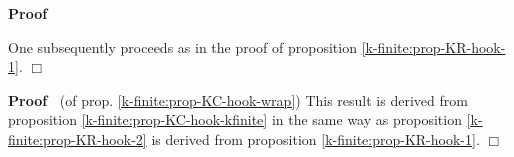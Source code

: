 \documentclass{article}
\newenvironment{proof}{\noindent\textbf{Proof\ }}{\hspace*{\fill}$\Box$\medskip}
\begin{document}
\begin{proof}
  
  One subsequently proceeds as in the proof of proposition
  \ref{k-finite:prop-KR-hook-1}.
\end{proof}

\begin{proof}
  (of prop. \ref{k-finite:prop-KC-hook-wrap}) This result is derived from
  proposition \ref{k-finite:prop-KC-hook-kfinite} in the same way as
  proposition \ref{k-finite:prop-KR-hook-2} is derived from proposition
  \ref{k-finite:prop-KR-hook-1}.
\end{proof}

\

\

\

\

\

\

\

\

\

\

\

\

\
\end{document}
